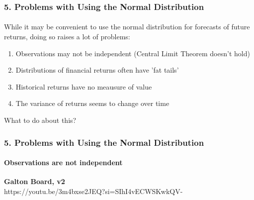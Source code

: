 \documentclass{beamer}
\begin{document}
\begin{frame}[t]
    \frametitle{5. Problems with Using the Normal Distribution}
    \framesubtitle{}

    While it may be convenient to use the normal distribution 
    for forecasts of future returns, doing so raises a lot of problems:
    \begin{enumerate}
        \item Observations may not be independent (Central Limit Theorem doesn't hold)
        \item Distributions of financial returns often have 'fat tails'
        \item Historical returns have no meausure of value
        \item The variance of returns seems to change over time
    \end{enumerate}
    \vspace{1em}
    What to do about this?
\end{frame}

\begin{frame}[t]
    \frametitle{5. Problems with Using the Normal Distribution}
    \framesubtitle{Observations are not independent}

    \textbf{Galton Board, v2}\\
    \vspace{2em}
    https://youtu.be/3m4bxse2JEQ?si=SIhI4vECWSKwkQV-

\end{frame}
\end{document}
